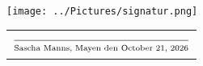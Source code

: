 \documentclass[a4paper,latin]{friggeri-cv} %
\begin{document}


\begin{center}
\texttt{[image: ../Pictures/signatur.png]} \\
\begin{tabular}{@{}l@{}}
\\ $\frac{}{\strut\textnormal{Sascha Manns, Mayen den \today}}$
\end{tabular}
\end{center}

\end{document}
